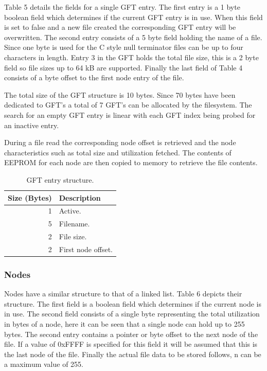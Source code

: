 Table 5 details the fields for a single GFT entry. The first entry is a 1 byte boolean field which determines if the current GFT entry is in use. When this field is set to false and a new file created the corresponding GFT entry will be overwritten. The second entry consists of a 5 byte field holding the name of a file. Since one byte is used for the C style null terminator files can be up to four characters in length. Entry 3 in the GFT holds the total file size, this is a 2 byte field so file sizes up to 64 kB are supported. Finally the last field of Table 4 consists of a byte offset to the first node entry of the file.

The total size of the GFT structure is 10 bytes. Since 70 bytes have been dedicated to GFT's a total of 7 GFT's can be allocated by the filesystem. The search for an empty GFT entry is linear with each GFT index being probed for an inactive entry.

During a file read the corresponding node offset is retrieved and the node characteristics such as total size and utilization fetched. The contents of EEPROM for each node are then copied to memory to retrieve the file contents.
\begin{table}[H]
\centering
\begin{tabular}{|r|l|}
\hline
\multicolumn{1}{|l|}{\textbf{Size (Bytes)}} & \textbf{Description} \\ \hline
1 & Active. \\ \hline
5 & Filename. \\ \hline
2 & File size.\\ \hline
2 & First node offset.\\ \hline

\end{tabular}
\caption{GFT entry structure.}
\label{tbl:HWSWRequirements}
\end{table}



\subsubsection{Nodes}
Nodes have a similar structure to that of a linked list. Table 6 depicts their structure. The first field is a boolean field which determines if the current node is in use. The second field consists of a single byte representing the total utilization in bytes of a node, here it can be seen that a single node can hold up to 255 bytes. The second entry contains a pointer or byte offset to the next node of the file. If a value of 0xFFFF is specified for this field it will be assumed that this is the last node of the file. Finally the actual file data to be stored follows, n can be a maximum value of 255.

